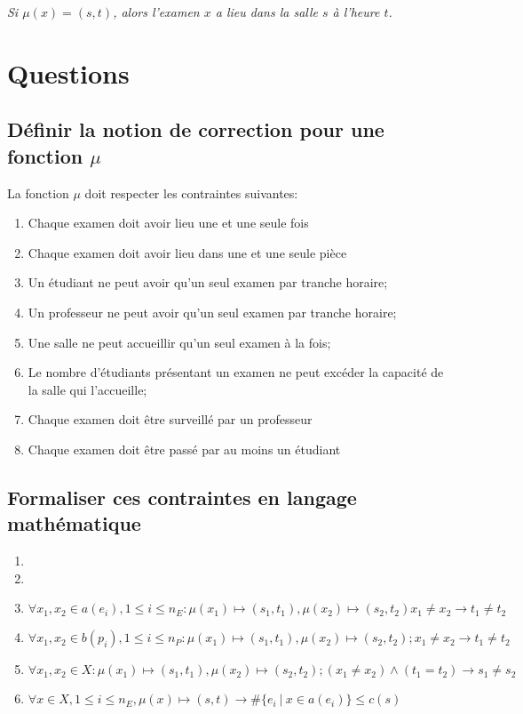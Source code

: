 \documentclass[a4paper]{article}
\begin{document}
\textit{Si $\mu(x) = (s,t)$, alors l'examen $x$ a lieu dans la salle $s$ à l'heure $t$.}

\section{Questions}
\subsection{Définir la notion de correction pour une fonction $\mu$}
La fonction $\mu$ doit respecter les contraintes suivantes:
\begin{enumerate}
  \item Chaque examen doit avoir lieu une et une seule fois
  \item Chaque examen doit avoir lieu dans une et une seule pièce
  \item Un étudiant ne peut avoir qu'un seul examen par tranche horaire;
  \item Un professeur ne peut avoir qu'un seul examen par tranche horaire;
  \item Une salle ne peut accueillir qu'un seul examen à la fois;
  \item Le nombre d'étudiants présentant un examen ne peut excéder la capacité de la salle qui l'accueille;
  \item Chaque examen doit être surveillé par un professeur
  \item Chaque examen doit être passé par au moins un étudiant
\end{enumerate}

\subsection{Formaliser ces contraintes en langage mathématique}
\begin{enumerate}
  \item 
  \item 
  \item $\forall x_1,x_2 \in a(e_i), 1 \le i \le n_E: \mu(x_1) \mapsto (s_1,t_1), \mu(x_2) \mapsto (s_2,t_2) x_1 \neq x_2 \rightarrow t_1 \neq t_2 $
  \item $\forall x_1,x_2 \in b(p_i), 1 \le i \le n_P: \mu(x_1) \mapsto (s_1,t_1), \mu(x_2) \mapsto (s_2,t_2); x_1 \neq x_2 \rightarrow t_1 \neq t_2 $
  \item $\forall x_1,x_2 \in X: \mu(x_1) \mapsto (s_1,t_1), \mu(x_2) \mapsto (s_2,t_2); (x_1 \neq x_2) \land (t_1 = t_2) \rightarrow s_1 \neq s_2 $
  \item $\forall x \in X, 1 \le i \le n_E, \mu(x) \mapsto (s,t) \rightarrow \#\{e_i\ |\ x \in a(e_i)\} \le c(s)$
\end{enumerate}
\end{document}
